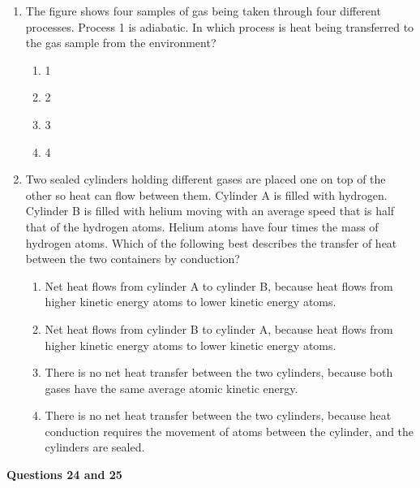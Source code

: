 \documentclass{../../../oss-apphys}
\begin{document}
\begin{multicols}{2}
\begin{enumerate}[leftmargin=18pt,start=3]
  \item The figure shows four samples of gas being taken through four
    different processes. Process 1 is adiabatic. In which process is heat being
    transferred to the gas sample from the environment?
    \begin{center}
      \vspace{-.15in}
    \end{center}
    \begin{enumerate}[noitemsep,topsep=0pt,leftmargin=18pt,label=(\Alph*)]
    \item\num{1}
    \item\num{2}
    \item\num{3}
    \item\num{4}
    \end{enumerate}

    \columnbreak
    
  \item Two sealed cylinders holding different gases are placed one on top of
    the other so heat can flow between them. Cylinder A is filled with
    hydrogen. Cylinder B is filled with helium moving with an average speed
    that is half that of the hydrogen atoms. Helium atoms have four times the
    mass of hydrogen atoms. Which of the following best describes the transfer
    of heat between the two containers by conduction?
    \begin{enumerate}[noitemsep,topsep=0pt,leftmargin=18pt,label=(\Alph*)]
    \item Net heat flows from cylinder A to cylinder B, because heat flows from
      higher kinetic energy atoms to lower kinetic energy atoms.
    \item Net heat flows from cylinder B to cylinder A, because heat flows from
      higher kinetic energy atoms to lower kinetic energy atoms.
    \item There is no net heat transfer between the two cylinders, because both
      gases have the same average atomic kinetic energy.
    \item There is no net heat transfer between the two cylinders, because heat
      conduction requires the movement of atoms between the cylinder, and the
      cylinders are sealed.
    \end{enumerate}
  \end{enumerate}

  \columnbreak
  
  \textbf{Questions 24 and 25}


\end{multicols}
\end{document}
